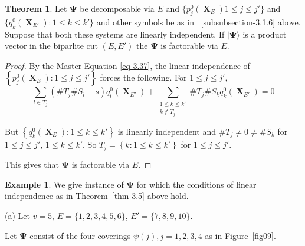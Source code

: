 \documentclass[a4paper,12pt]{article}
\DeclareMathOperator{\x}{\mathrm{X}}
\theoremstyle{definition}
\theoremstyle{underlinethm}
\newtheorem{thm}{Theorem}[section]
\newtheorem{example}{Example}[section]
\theoremstyle{definition}
\begin{document}
\begin{thm}\label{thm-3.5}
Let $\boldsymbol{\Psi}$ be decomposable via $E$ and $\{p_{j}^{0}(\boldsymbol{\x}_{E}) 1 \leq j \leq j'\}$ and $\{q_{k}^{0} (\boldsymbol{\x}_{E'}) : 1 \leq k \leq k'\}$ and other symbols be as in ~\eqref{subsubsection-3.1.6} above. Suppose that both these systems are linearly independent. If $| \boldsymbol{\Psi} \rangle$ is a product vector in the biparlite cut $(E, E')$ the $\boldsymbol{\Psi}$ is factorable via $E$.
\end{thm}

\begin{proof}
By the Master Equation \eqref{eq-3.37}, the linear independence of $\left\{p_{j}^{0} (\boldsymbol{\x}_{E}) : 1 \leq j \leq j'\right\}$ forces the following. For $1 \leq j \leq j'$,  
\begin{equation}
\sum\limits_{l\in T_{j}} (\# T_{j} \# S_{l}-s) q_{l}^{0}(\boldsymbol{\x}_{E'}) + \sum_{\substack{1 \leq k \leq k'\\ k \notin T_{j}}} \# T_{j} \# S_{k} q_{k}^{0}(\boldsymbol{\x}_{E'}) = 0\tag{3.40}\label{eq-3.40} 
\end{equation}

But $\left\{q_{k}^{0}(\boldsymbol{\x}_{E}): 1 \leq k \leq k' \right\}$ is linearly independent and $\# T_{j} \neq 0 \neq \# S_{k}$ for $1 \leq j \leq j'$, $1 \leq k \leq k'$. So $T_{j} = \left\{k : 1 \leq k \leq k'\right\}$ for $1 \leq j \leq j'$.

This gives that $\boldsymbol{\Psi}$ is factorable via $E$.
\end{proof}

\begin{example}\label{example-3.3}
We give instance of $\boldsymbol{\Psi}$ for which the conditions of linear independence as in Theorem~\eqref{thm-3.5} above hold. 

(a) Let $v=5$, $E = \{1,2,3,4,5,6\}$, $E' = \{7,8,9,10\}$.

Let $\boldsymbol{\Psi}$ consist of the four coverings $\psi (j), j = 1,2,3,4$ as in Figure~\eqref{fig09}.
\end{example}
\end{document}
